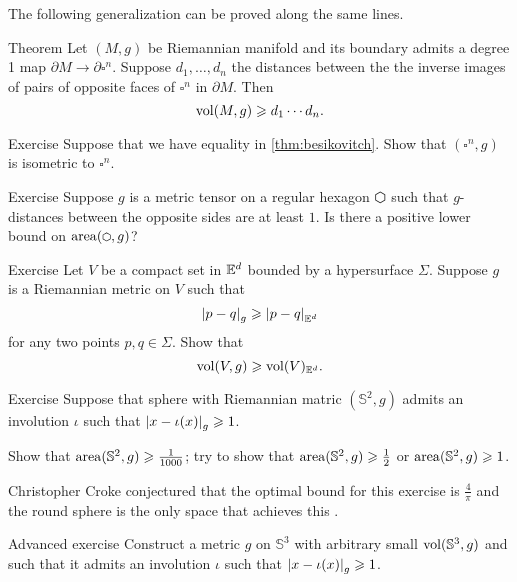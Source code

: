 The following generalization can be proved along the same lines.

\begin{thm}{Theorem}\label{thm:besikovitch+}
Let $(M,g)$ be Riemannian manifold and its boundary admits a degree 1 map $\partial M\to\partial\square^n$. 
Suppose $d_1,\dots, d_n$ the distances between the the inverse images of pairs of opposite faces of $\square^n$ in $\partial M$.
Then 
\[\operatorname{\rm vol}\nolimits(M,g)\geqslant d_1\cdots d_n.\]
\end{thm}

\begin{thm}{Exercise}\label{ex:besikovitch=}
Suppose that we have equality in \ref{thm:besikovitch}.
Show that $(\square^n,g)$ is isometric to $\square^n$.
\end{thm}

\begin{thm}{Exercise}\label{ex:hexagon}
Suppose $g$ is a metric tensor on a regular hexagon $\varhexagon
   $ such that $g$-distances between the opposite sides are at least $1$.
Is there a positive lower bound on $\area(\varhexagon,g)$?
\end{thm}

\begin{thm}{Exercise}\label{ex:gadograph}
Let $V$ be a compact set in $\mathbb{E}^d$ bounded by a hypersurface $\Sigma$.
Suppose $g$ is a Riemannian metric on $V$ such that 
\[\dist{p}{q}{g}\ge\dist{p}{q}{\EE^d}\]
for any two points $p,q\in \Sigma$.
Show that
\[\operatorname{\rm vol}\nolimits(V,g)\geqslant \operatorname{\rm vol}\nolimits(V)_{\mathbb{E}^d}.\]
 
\end{thm}

\begin{thm}{Exercise}\label{ex:involution-of-sphere}
Suppose that sphere with Riemannian matric $(\mathbb{S}^2,g)$ admits an involution $\iota$ such that $\dist{x}{\iota(x)}{g}\ge 1$.

Show that $\operatorname{\rm area}\nolimits(\mathbb{S}^2,g)\geqslant \tfrac1{1000}$;
try to show that $\operatorname{\rm area}\nolimits(\mathbb{S}^2,g)\geqslant \tfrac12$ or $\operatorname{\rm area}\nolimits(\mathbb{S}^2,g)\geqslant 1$.
\end{thm}

Christopher Croke conjectured that the optimal bound for this exercise is $\tfrac4\pi$ and the round sphere is the only space that achieves this \cite[see Conjecture 0.3 in][]{croke}.

\begin{thm}{Advanced exercise}\label{ex:involution-of-3sphere}
Construct a metric $g$ on $\mathbb{S}^3$ with arbitrary small $\operatorname{\rm vol}\nolimits(\mathbb{S}^3,g)$ and such that it admits an involution $\iota$ such that $\dist{x}{\iota(x)}{g}\ge 1$.
\end{thm}


